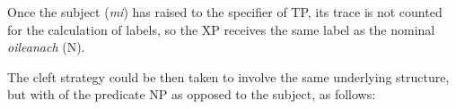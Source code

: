 \documentclass[output=paper]{langsci/langscibook}
\begin{document}
\ea
\z

%
%

Once the subject (\emph{mi}) has raised to the specifier of TP, its trace is not counted for the calculation of labels, so the XP receives the same label as the nominal \emph{oileanach} (N).

The cleft strategy could be then taken to involve the same underlying structure,
but with  of the predicate NP as opposed to the subject, as follows:

\ea
%
\z
\end{document}
